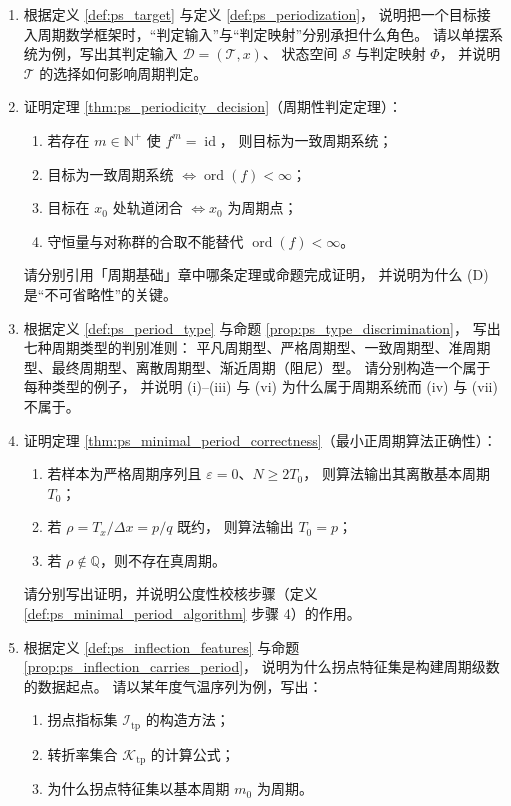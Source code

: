 \begin{enumerate}[leftmargin=3em, label=\textbf{题 \arabic*}]
    \item 根据定义 \ref{def:ps_target} 与定义 \ref{def:ps_periodization}，
    说明把一个目标接入周期数学框架时，“判定输入”与“判定映射”分别承担什么角色。
    请以单摆系统为例，写出其判定输入 $\mathcal{D}=(\mathcal{T},x)$、
    状态空间 $\mathcal{S}$ 与判定映射 $\Phi$，
    并说明 $\mathcal{T}$ 的选择如何影响周期判定。

    \item 证明定理 \ref{thm:ps_periodicity_decision}（周期性判定定理）：
    \begin{enumerate}[label=(\Alph*)]
        \item 若存在 $m\in\mathbb{N}^+$ 使 $f^m=\operatorname{id}$，
              则目标为一致周期系统；
        \item 目标为一致周期系统 $\iff\operatorname{ord}(f)<\infty$；
        \item 目标在 $x_0$ 处轨道闭合 $\iff x_0$ 为周期点；
        \item 守恒量与对称群的合取不能替代 $\operatorname{ord}(f)<\infty$。
    \end{enumerate}
    请分别引用「周期基础」章中哪条定理或命题完成证明，
    并说明为什么 (D) 是“不可省略性”的关键。

    \item 根据定义 \ref{def:ps_period_type} 与命题 \ref{prop:ps_type_discrimination}，
    写出七种周期类型的判别准则：
    平凡周期型、严格周期型、一致周期型、准周期型、最终周期型、离散周期型、渐近周期（阻尼）型。
    请分别构造一个属于每种类型的例子，
    并说明 (i)--(iii) 与 (vi) 为什么属于周期系统而 (iv) 与 (vii) 不属于。

    \item 证明定理 \ref{thm:ps_minimal_period_correctness}（最小正周期算法正确性）：
    \begin{enumerate}[label=(\roman*)]
        \item 若样本为严格周期序列且 $\varepsilon=0$、$N\ge2T_0$，
              则算法输出其离散基本周期 $T_0$；
        \item 若 $\rho=T_x/\Delta x=p/q$ 既约，
              则算法输出 $T_0=p$；
        \item 若 $\rho\notin\mathbb{Q}$，则不存在真周期。
    \end{enumerate}
    请分别写出证明，并说明公度性校核步骤（定义 \ref{def:ps_minimal_period_algorithm} 步骤 4）的作用。

    \item 根据定义 \ref{def:ps_inflection_features} 与命题 \ref{prop:ps_inflection_carries_period}，
    说明为什么拐点特征集是构建周期级数的数据起点。
    请以某年度气温序列为例，写出：
    \begin{enumerate}[label=(\roman*)]
        \item 拐点指标集 $\mathcal{I}_{\mathrm{tp}}$ 的构造方法；
        \item 转折率集合 $\mathcal{K}_{\mathrm{tp}}$ 的计算公式；
        \item 为什么拐点特征集以基本周期 $m_0$ 为周期。
    \end{enumerate}


\end{enumerate}
